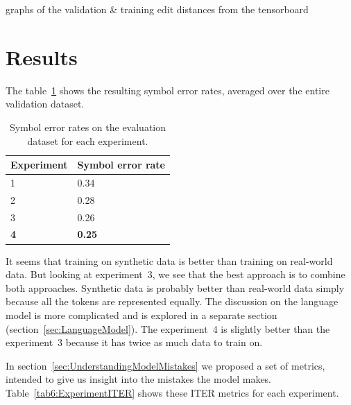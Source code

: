 \begin{code}
graphs of the validation & training edit distances from the tensorboard
\end{code}


\section{Results}
\label{sec:Results}

The table~\ref{tab6:ExperimentSER} shows the resulting symbol error rates, averaged over the entire validation dataset.

\begin{table}[h] \centering
\begin{tabular}{ll}
\toprule
\textbf{Experiment} & \textbf{Symbol error rate} \\
\midrule
1 & 0.34 \\
2 & 0.28 \\
3 & 0.26 \\
\textbf{4} & \textbf{0.25} \\
\bottomrule
\end{tabular}
\caption{Symbol error rates on the evaluation dataset for each experiment.}
\label{tab6:ExperimentSER}
\end{table}

It seems that training on synthetic data is better than training on real-world data. But looking at experiment~3, we see that the best approach is to combine both approaches. Synthetic data is probably better than real-world data simply because all the tokens are represented equally. The discussion on the language model is more complicated and is explored in a separate section (section~\ref{sec:LanguageModel}). The experiment~4 is slightly better than the experiment~3 because it has twice as much data to train on.

In section~\ref{sec:UnderstandingModelMistakes} we proposed a set of metrics, intended to give us insight into the mistakes the model makes. Table~\ref{tab6:ExperimentITER} shows these ITER metrics for each experiment.

